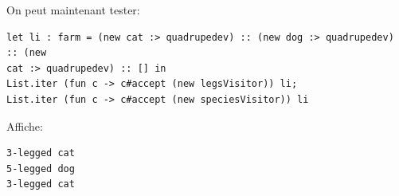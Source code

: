 \documentclass[a4paper]{article}
\begin{document}
On peut maintenant tester:

\begin{verbatim}
let li : farm = (new cat :> quadrupedev) :: (new dog :> quadrupedev) :: (new
cat :> quadrupedev) :: [] in
List.iter (fun c -> c#accept (new legsVisitor)) li;
List.iter (fun c -> c#accept (new speciesVisitor)) li
\end{verbatim}

Affiche:
\begin{verbatim}
3-legged cat
5-legged dog
3-legged cat
\end{verbatim}
\end{document}

